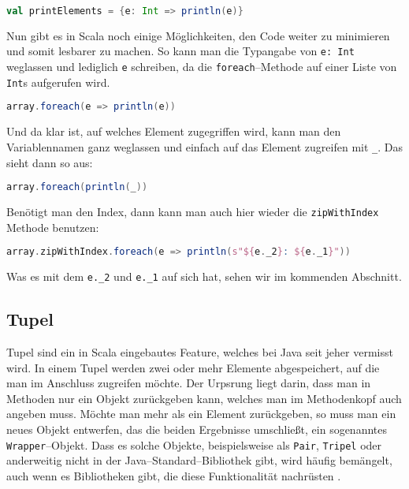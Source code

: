 \begin{lstlisting}[language=Scala,numbers=none]
val printElements = {e: Int => println(e)}
\end{lstlisting}

Nun gibt es in Scala noch einige Möglichkeiten, den Code weiter zu minimieren und somit lesbarer zu machen. So kann man die Typangabe von \texttt{e: Int} weglassen und lediglich \texttt{e} schreiben, da die \texttt{foreach}--Methode auf einer Liste von \texttt{Int}s aufgerufen wird.

\begin{lstlisting}[language=Scala,numbers=none]
array.foreach(e => println(e))
\end{lstlisting}

Und da klar ist, auf welches Element zugegriffen wird, kann man den Variablennamen ganz weglassen und einfach auf das Element zugreifen mit \texttt{\_}. Das sieht dann so aus:

\begin{lstlisting}[language=Scala,numbers=none]
array.foreach(println(_))
\end{lstlisting}

Benötigt man den Index, dann kann man auch hier wieder die \texttt{zipWithIndex} Methode benutzen:

\begin{lstlisting}[language=Scala,numbers=none]
array.zipWithIndex.foreach(e => println(s"${e._2}: ${e._1}"))
\end{lstlisting}

Was es mit dem \texttt{e.\_2} und \texttt{e.\_1} auf sich hat, sehen wir im kommenden Abschnitt.

\subsection{Tupel}
Tupel sind ein in Scala eingebautes Feature, welches bei Java seit jeher vermisst wird. In einem Tupel werden zwei oder mehr Elemente abgespeichert, auf die man im Anschluss zugreifen möchte. Der Urpsrung liegt darin, dass man in Methoden nur ein Objekt zurückgeben kann, welches man im Methodenkopf auch angeben muss. Möchte man mehr als ein Element zurückgeben, so muss man ein neues Objekt entwerfen, das die beiden Ergebnisse umschließt, ein sogenanntes \texttt{Wrapper}--Objekt. Dass es solche Objekte, beispielsweise als \texttt{Pair}, \texttt{Tripel} oder anderweitig nicht in der Java--Standard--Bibliothek gibt, wird häufig bemängelt\cite{WhatsWrongWithJava8}, auch wenn es Bibliotheken gibt, die diese Funktionalität nachrüsten \cite{JavaTuples}.

